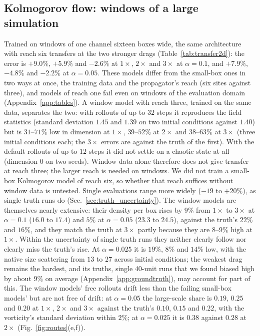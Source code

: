 \subsection{Kolmogorov flow: windows of a large simulation}
\label{sec:window_fix}

Trained on windows of one channel sixteen boxes wide, the same
architecture with reach six transfers at the two stronger drags
(Table~\ref{tab:transfer2d}): the error is $+9.0\%$, $+5.9\%$ and $-2.6\%$ at
$1\times$, $2\times$ and $3\times$ at $\alpha=0.1$, and $+7.9\%$, $-4.8\%$ and $-2.2\%$ at
$\alpha=0.05$. These models differ from the small-box ones in two ways at
once, the training data and the propagator's reach (six sites against
three), and models of reach one fail even on windows of the evaluation
domain (Appendix~\ref{app:tables}). A window model with reach three,
trained on the same data, separates the two: with rollouts of up to $32$
steps it reproduces the field statistics (standard deviation $1.45$ and $1.39$
on two initial conditions against $1.40$) but is $31$--$71\%$ low in
dimension at $1\times$, $39$--$52\%$ at $2\times$ and $38$--$63\%$ at
$3\times$ (three initial conditions each; the $3\times$ errors are against the
truth of the first). With the default rollouts of up to $12$ steps it did not
settle on a chaotic state at all (dimension $0$ on two seeds). Window data
alone therefore does not give transfer at reach three; the larger reach is
needed on windows. We did not train a small-box Kolmogorov model of reach
six, so whether that reach suffices without window data is untested. Single evaluations range more widely ($-19$ to $+20\%$), as single
truth runs do (Sec.~\ref{sec:truth_uncertainty}). The window models are
themselves nearly extensive: their density per box rises by $9\%$ from
$1\times$ to $3\times$ at $\alpha=0.1$ ($16.0$ to $17.4$) and $5\%$ at $\alpha=0.05$
($23.3$ to $24.5$), against the truth's $22\%$ and $16\%$, and they match the
truth at $3\times$ partly because they are $8$--$9\%$ high at $1\times$. Within the
uncertainty of single truth runs they neither clearly follow nor clearly
miss the truth's rise. At $\alpha=0.025$ it is $19\%$, $8\%$ and
$14\%$ low, with the native size scattering from $13$ to $27$ across initial
conditions; the weakest drag remains the hardest, and its truths, single
40-unit runs that we found biased high by about $9\%$ on average
(Appendix~\ref{app:groundtruth}), may account for part of this. The window
models' free rollouts drift less than the failing small-box models' but
are not free of drift: at $\alpha=0.05$ the large-scale share is $0.19$, $0.25$
and $0.20$ at $1\times$, $2\times$ and $3\times$ against the truth's $0.10$, $0.15$
and $0.22$, with the vorticity's standard deviation within $2\%$; at
$\alpha=0.025$ it is $0.38$ against $0.28$ at $2\times$ (Fig.~\ref{fig:routes}(e,f)).

